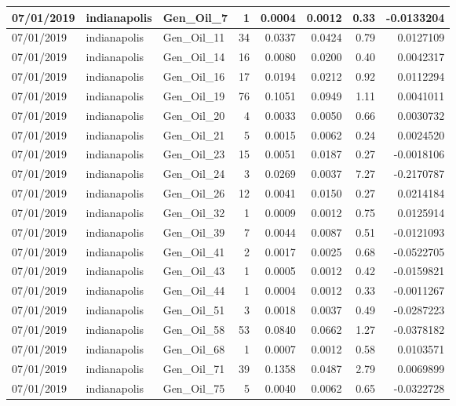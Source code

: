 \documentclass[
  letterpaper,
  DIV=11,
  numbers=noendperiod]{scrartcl}
\begin{document}
\begin{tabular}{l|l|l|r|r|r|r|r}
\hline
07/01/2019 & indianapolis & Gen\_Oil\_7 & 1 & 0.0004 & 0.0012 & 0.33 & -0.0133204\\
\hline
07/01/2019 & indianapolis & Gen\_Oil\_11 & 34 & 0.0337 & 0.0424 & 0.79 & 0.0127109\\
\hline
07/01/2019 & indianapolis & Gen\_Oil\_14 & 16 & 0.0080 & 0.0200 & 0.40 & 0.0042317\\
\hline
07/01/2019 & indianapolis & Gen\_Oil\_16 & 17 & 0.0194 & 0.0212 & 0.92 & 0.0112294\\
\hline
07/01/2019 & indianapolis & Gen\_Oil\_19 & 76 & 0.1051 & 0.0949 & 1.11 & 0.0041011\\
\hline
07/01/2019 & indianapolis & Gen\_Oil\_20 & 4 & 0.0033 & 0.0050 & 0.66 & 0.0030732\\
\hline
07/01/2019 & indianapolis & Gen\_Oil\_21 & 5 & 0.0015 & 0.0062 & 0.24 & 0.0024520\\
\hline
07/01/2019 & indianapolis & Gen\_Oil\_23 & 15 & 0.0051 & 0.0187 & 0.27 & -0.0018106\\
\hline
07/01/2019 & indianapolis & Gen\_Oil\_24 & 3 & 0.0269 & 0.0037 & 7.27 & -0.2170787\\
\hline
07/01/2019 & indianapolis & Gen\_Oil\_26 & 12 & 0.0041 & 0.0150 & 0.27 & 0.0214184\\
\hline
07/01/2019 & indianapolis & Gen\_Oil\_32 & 1 & 0.0009 & 0.0012 & 0.75 & 0.0125914\\
\hline
07/01/2019 & indianapolis & Gen\_Oil\_39 & 7 & 0.0044 & 0.0087 & 0.51 & -0.0121093\\
\hline
07/01/2019 & indianapolis & Gen\_Oil\_41 & 2 & 0.0017 & 0.0025 & 0.68 & -0.0522705\\
\hline
07/01/2019 & indianapolis & Gen\_Oil\_43 & 1 & 0.0005 & 0.0012 & 0.42 & -0.0159821\\
\hline
07/01/2019 & indianapolis & Gen\_Oil\_44 & 1 & 0.0004 & 0.0012 & 0.33 & -0.0011267\\
\hline
07/01/2019 & indianapolis & Gen\_Oil\_51 & 3 & 0.0018 & 0.0037 & 0.49 & -0.0287223\\
\hline
07/01/2019 & indianapolis & Gen\_Oil\_58 & 53 & 0.0840 & 0.0662 & 1.27 & -0.0378182\\
\hline
07/01/2019 & indianapolis & Gen\_Oil\_68 & 1 & 0.0007 & 0.0012 & 0.58 & 0.0103571\\
\hline
07/01/2019 & indianapolis & Gen\_Oil\_71 & 39 & 0.1358 & 0.0487 & 2.79 & 0.0069899\\
\hline
07/01/2019 & indianapolis & Gen\_Oil\_75 & 5 & 0.0040 & 0.0062 & 0.65 & -0.0322728\\

\end{tabular}
\end{document}
